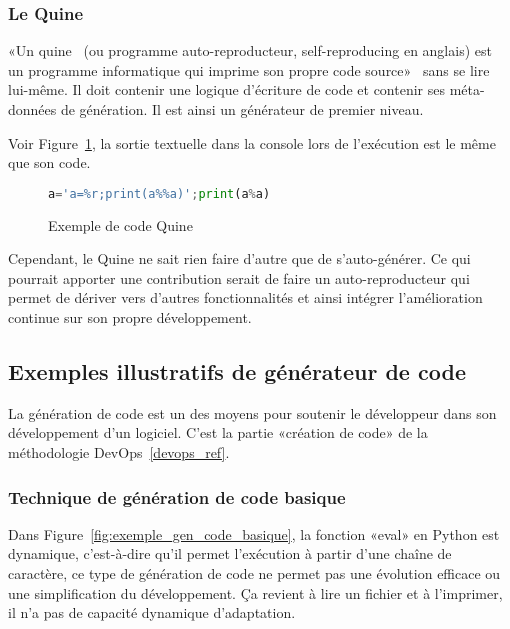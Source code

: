 \subsubsection{Le Quine}

«Un quine~\cite{sarkar2020quines} (ou programme auto-reproducteur, self-reproducing en anglais) est un programme informatique qui imprime son propre code source»~\cite{wiki_quine} sans se lire lui-même. Il doit contenir une logique d’écriture de code et contenir ses méta-données de génération. Il est ainsi un générateur de premier niveau.

Voir Figure~\ref{fig:exemple_quine}, la sortie textuelle dans la console lors de l'exécution est le même que son code.

\begin{figure}
\begin{lstlisting}[language=Python]
a='a=%r;print(a%%a)';print(a%a)
\end{lstlisting}
\caption{Exemple de code Quine}
\label{fig:exemple_quine}
\end{figure}

Cependant, le Quine ne sait rien faire d’autre que de s’auto-générer. Ce qui pourrait apporter une contribution serait de faire un auto-reproducteur qui permet de dériver vers d’autres fonctionnalités et ainsi intégrer l’amélioration continue sur son propre développement.

\subsection{Exemples illustratifs de générateur de code}

La génération de code est un des moyens pour soutenir le développeur dans son développement d’un logiciel. C’est la partie «création de code» de la méthodologie DevOps~\ref{devops_ref}.

\subsubsection{Technique de génération de code basique}

Dans Figure~\ref{fig:exemple_gen_code_basique}, la fonction «eval» en Python est dynamique, c'est-à-dire qu’il permet l’exécution à partir d’une chaîne de caractère, ce type de génération de code ne permet pas une évolution efficace ou une simplification du développement. Ça revient à lire un fichier et à l'imprimer, il n’a pas de capacité dynamique d’adaptation.

